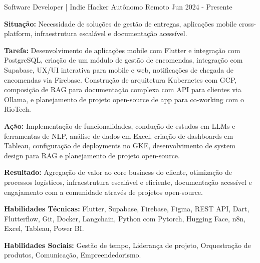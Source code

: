 

\begin{cventries}

  \cventry
    {Software Developer | Indie Hacker} %
    {Autônomo} %
    {Remoto} %
    {Jun 2024 - Presente} %
    {
      \begin{cvitems} %
        \item {\textbf{Situação:} Necessidade de soluções de gestão de entregas, aplicações mobile cross-platform, infraestrutura escalável e documentação acessível.}
        \item {\textbf{Tarefa:} Desenvolvimento de aplicações mobile com Flutter e integração com PostgreSQL, criação de um módulo de gestão de encomendas, integração com Supabase, UX/UI interativa para mobile e web, notificações de chegada de encomendas via Firebase. Construção de arquitetura Kubernetes com GCP, composição de RAG para documentação complexa com API para clientes via Ollama, e planejamento de projeto open-source de app para co-working com o RioTech.}
        \item{\textbf{Ação:} Implementação de funcionalidades, condução de estudos em LLMs e ferramentas de NLP, análise de dados em Excel, criação de dashboards em Tableau, configuração de deployments no GKE, desenvolvimento de system design para RAG e planejamento de projeto open-source.}
        \item {\textbf{Resultado:} Agregação de valor ao core business do cliente, otimização de processos logísticos, infraestrutura escalável e eficiente, documentação acessível e engajamento com a comunidade através de projetos open-source.}
        \item {\textbf{Habilidades Técnicas:} Flutter, Supabase, Firebase, Figma, REST API, Dart, Flutterflow, Git, Docker, Langchain, Python com Pytorch, Hugging Face, n8n, Excel, Tableau, Power BI.}
        \item {\textbf{Habilidades Sociais:} Gestão de tempo, Liderança de projeto, Orquestração de produtos, Comunicação, Empreendedorismo.}
      \end{cvitems}
    }
    

\end{cventries}
